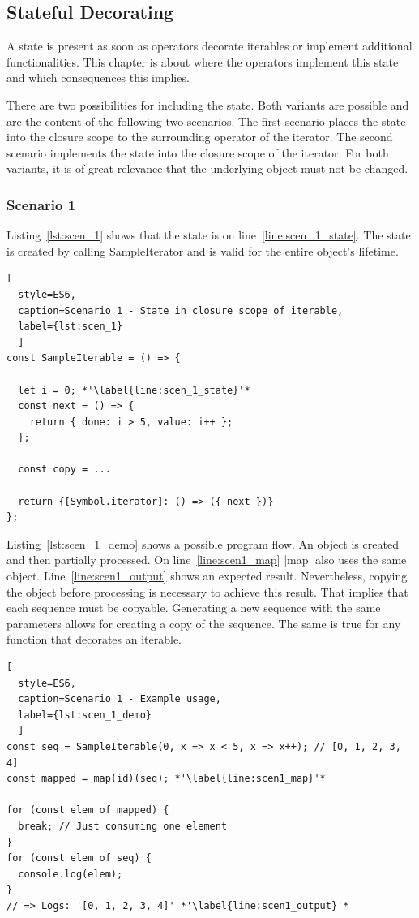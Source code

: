 \subsection{Stateful Decorating}
\label{sub:Stateful Decorating}
A state is present as soon as operators decorate iterables or implement 
additional functionalities. This chapter is about where the operators implement 
this state and which consequences this implies.

There are two possibilities for including the state.
Both variants are possible and are the content of the following two scenarios. 
The first scenario places the state into the closure scope to the surrounding 
operator of the iterator. The second scenario implements the state into the 
closure scope of the iterator. For both variants, it is of great relevance that 
the underlying object must not be changed.

\subsubsection{Scenario 1}
Listing~\ref{lst:scen_1} shows that the state is on line~\ref{line:scen_1_state}.
The state is created by calling SampleIterator and is valid for the entire 
object's lifetime. 

\begin{lstlisting}[
  style=ES6, 
  caption=Scenario 1 - State in closure scope of iterable,
  label={lst:scen_1}
  ]
const SampleIterable = () => {

  let i = 0; *'\label{line:scen_1_state}'*
  const next = () => {
    return { done: i > 5, value: i++ };
  };

  const copy = ...

  return {[Symbol.iterator]: () => ({ next })}
};
\end{lstlisting}

Listing~\ref{lst:scen_1_demo} shows a possible program flow. An object is 
created and then partially processed. On line~\ref{line:scen1_map} |map| also 
uses the same object. Line~\ref{line:scen1_output} shows an expected result. 
Nevertheless, copying the object before processing is necessary to achieve this 
result. That implies that each sequence must be copyable. Generating a new 
sequence with the same parameters allows for creating a copy of the sequence. 
The same is true for any function that decorates an iterable.

\begin{lstlisting}[
  style=ES6, 
  caption=Scenario 1 - Example usage,
  label={lst:scen_1_demo}
  ]
const seq = SampleIterable(0, x => x < 5, x => x++); // [0, 1, 2, 3, 4]
const mapped = map(id)(seq); *'\label{line:scen1_map}'*

for (const elem of mapped) {
  break; // Just consuming one element
}
for (const elem of seq) {
  console.log(elem);
}
// => Logs: '[0, 1, 2, 3, 4]' *'\label{line:scen1_output}'*
\end{lstlisting}

